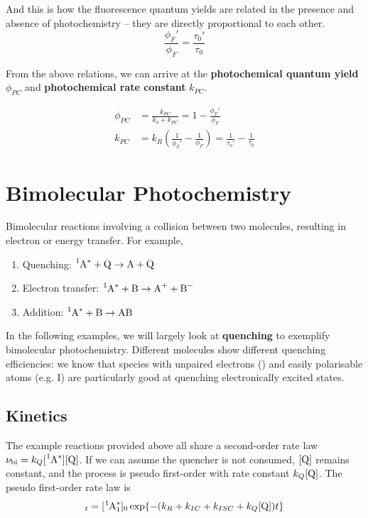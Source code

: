 \documentclass[a4paper]{tufte-handout}
\theoremstyle{definition}
\begin{document}
And this is how the fluorescence quantum yields are related in the presence and absence of photochemistry -- they are directly proportional to each other.
$$\frac{\phi_F'}{\phi_F} = \frac{\tau_0'}{\tau_0}$$

From the above relations, we can arrive at the \textbf{photochemical quantum yield} $\phi_{PC}$ and \textbf{photochemical rate constant} $k_{PC}$.

\begin{align}
  \phi_{PC} &= \frac{k_{PC}}{k_0 + k_{PC}} = 1 - \frac{\phi_F'}{\phi_F} \\
  k_{PC} &= k_R \left( \frac{1}{\phi_F'} - \frac{1}{\phi_F}\right) = \frac{1}{\tau_o'}- \frac{1}{\tau_0}
\end{align}

\section{Bimolecular Photochemistry}

Bimolecular reactions involving a collision between two molecules, resulting in electron or energy transfer. For example,

\begin{enumerate}
  \item Quenching: $\ce{^1A^*} + \ce{Q} \rightarrow \ce{A} + \ce{Q}$
  \item Electron transfer: $\ce{^1A^*} + \ce{B} \rightarrow \ce{A+} + \ce{B-}$
  \item Addition: $\ce{^1A^*} + \ce{B} \rightarrow \ce{AB}$
\end{enumerate}

In the following examples, we will largely look at \textbf{quenching} to exemplify bimolecular photochemistry.
Different molecules show different quenching efficiencies: we know that species with unpaired electrons () and easily polarisable atoms 
(e.g. I) are particularly good at quenching electronically excited states.

\subsection*{Kinetics}

The example reactions provided above all share a second-order rate law $\nu_{\mathrm{bi}} = k_{Q}[\ce{^1A^*}][\ce{Q}]$.
If we can assume the quencher is not consumed, $[\ce{Q}]$ remains constant, and the process is pseudo first-order with rate constant $k_Q[\ce{Q}]$. The
pseudo first-order rate law is
\begin{equation}
  [\ce{^1A^*}_1]_t = [\ce{^1A^*}_1]_0 \exp \{ -(k_R + k_{IC} + k_{ISC} + k_Q[\ce{Q}])t \}
\end{equation}
\end{document}
